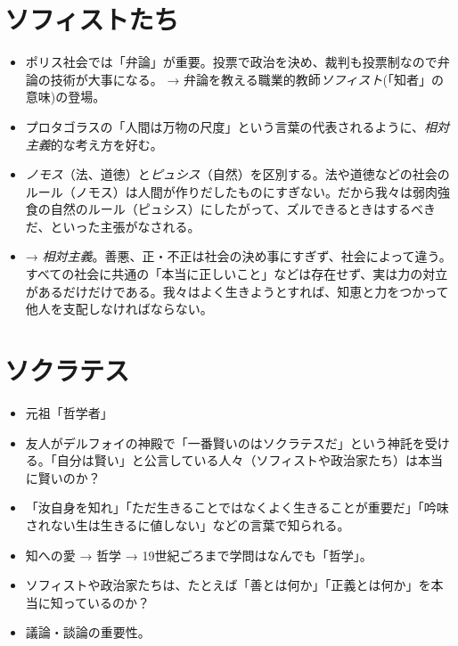 \documentclass[uplatex,dvipdfmx]{jsarticle} \usepackage{mystyle}%
\begin{document}
\section{ソフィストたち}

\begin{itemize}
\item ポリス社会では「弁論」が重要。投票で政治を決め、裁判も投票制なので弁論の技術が大事になる。
 → 弁論を教える職業的教師\emph{ソフィスト}(「知者」の意味)の登場。
\item プロタゴラスの「人間は万物の尺度」という言葉の代表されるように、\emph{相対主義}的な考え方を好む。
\item \emph{ノモス}（法、道徳）と\emph{ピュシス}（自然）を区別する。法や道徳などの社会のルール（ノモス）は人間が作りだしたものにすぎない。だから我々は弱肉強食の自然のルール（ピュシス）にしたがって、ズルできるときはするべきだ、といった主張がなされる。
\item → \emph{相対主義}。善悪、正・不正は社会の決め事にすぎず、社会によって違う。すべての社会に共通の「本当に正しいこと」などは存在せず、実は力の対立があるだけだけである。我々はよく生きようとすれば、知恵と力をつかって他人を支配しなければならない。

\end{itemize}




\section{ソクラテス}


\begin{itemize}
\item 元祖「哲学者」
\item 友人がデルフォイの神殿で「一番賢いのはソクラテスだ」という神託を受ける。「自分は賢い」と公言している人々（ソフィストや政治家たち）は本当に賢いのか？
\item 「汝自身を知れ」「ただ生きることではなくよく生きることが重要だ」「吟味されない生は生きるに値しない」などの言葉で知られる。
\item 知への愛 → 哲学 → 19世紀ごろまで学問はなんでも「哲学」。
\item ソフィストや政治家たちは、たとえば「善とは何か」「正義とは何か」を本当に知っているのか？

\item 議論・談論の重要性。
\end{itemize}
\end{document}
